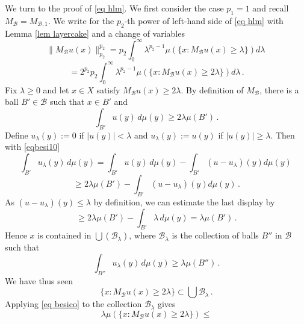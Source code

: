 {We turn to the proof of \eqref{eq hlm}. We first consider the case $p_1=1$ and recall $M_{\mathcal{B}}=M_{\mathcal{B},1}$.
We write for the $p_2$-th power of left-hand side of \eqref{eq hlm}
with Lemma \ref{lem layercake}
and a change of variables
\begin{equation}
    \|M_{\mathcal{B}}u(x)\|_{p_2}^{p_2}
   =p_2\int _0^{\infty}
    \lambda^{p_2-1} \mu(\{x: M_{\mathcal{B}}u(x)\ge \lambda\}) d\lambda\,
\end{equation}
\begin{equation} \label{eqbesi11}
   =2^{p_2} p_2\int _0^{\infty}
    \lambda^{p_2-1} \mu(\{x: M_{\mathcal{B}}u(x)\ge 2\lambda\}) d\lambda\, .
\end{equation}
Fix $\lambda\ge 0$ and let $x\in X$ satisfy $M_{\mathcal{B}}u(x)\ge 2\lambda$. By definition of $M_{\mathcal{B}}$, there is a ball
$B'\in \mathcal{B}$ such that
$x\in B'$ and
\begin{equation}\label{eqbesi10}
\int_{B'} u(y)\, d\mu(y)\ge 2\lambda \mu({B'})   \, .
\end{equation}
Define
$u_\lambda(y):=0$ if $|u(y)|<\lambda$ and $u_\lambda(y):=u(y)$ if $|u(y)|\ge \lambda$.
Then with \eqref{eqbesi10}
\begin{equation}
\int_{B'} u_\lambda (y)\, d\mu(y)
=\int_{B'} u (y)\, d\mu(y)-
\int_{B'} (u-u_\lambda) (y) d\mu(y)\,
\end{equation}
\begin{equation}
\ge 2\lambda \mu({B'})-
\int_{B'} (u-u_\lambda) (y) d\mu(y)\, .
\end{equation}
As $(u-u_\lambda)(y)\le \lambda$
by definition, we can estimate the last display by
\begin{equation}
\ge 2\lambda \mu({B'})-
\int_{B'} \lambda \,  d\mu(y)
=\lambda \mu({B'})\, .
\end{equation}
Hence $x$ is contained in
$\bigcup(\mathcal{B}_\lambda)$,
where $\mathcal{B}_\lambda$
is the collection of balls $B''$ in $\mathcal{B}$ such that
\begin{equation}
    \int_{B''} u_\lambda (y)\, d\mu(y)\ge \lambda \mu(B'')\, .
\end{equation}
We have thus seen
\begin{equation}
    \{x: M_{\mathcal{B}}u(x)\ge 2\lambda\}\subset
    \bigcup \mathcal{B}_\lambda
\, .
\end{equation}
Applying  \eqref{eq besico} to the  collection $\mathcal{B}_\lambda$
gives
\begin{equation}
    \lambda \mu(\{x: M_{\mathcal{B}}u(x)\ge 2\lambda\})\le

\end{equation}}
